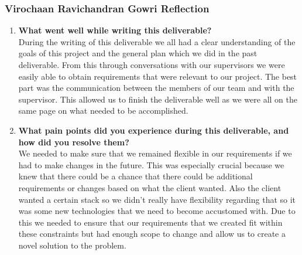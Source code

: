 \subsubsection*{Virochaan Ravichandran Gowri Reflection}
\begin{enumerate}
  \item \textbf{What went well while writing this deliverable?} \\
  During the writing of this deliverable we all had a clear understanding of the goals of this project and the general
  plan which we did in the past deliverable. From this through conversations with our supervisors we were easily able to
  obtain requirements that were relevant to our project. The best part was the communication between the members of our
  team and with the supervisor. This allowed us to finish the deliverable well as we were all on the same page on what needed to be accomplished.
  \item \textbf{What pain points did you experience during this deliverable, and how did you resolve them?} \\
  We needed to make sure that we remained flexible in our requirements if we had to make changes in the future. This was
  especially crucial because we knew that there could be a chance that there could be additional requirements or changes
  based on what the client wanted. Also the client wanted a certain stack so we didn't really have flexibility regarding
  that so it was some new technologies that we need to become accustomed with. Due to this we needed to ensure that our requirements that we created fit within these constraints but had enough scope to change and allow us to create a novel solution to the problem.


\end{enumerate}
